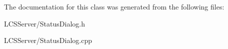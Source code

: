 The documentation for this class was generated from the following files\+:\begin{DoxyCompactItemize}
\item 
L\+C\+S\+Server/Status\+Dialog.\+h\item 
L\+C\+S\+Server/Status\+Dialog.\+cpp\end{DoxyCompactItemize}
